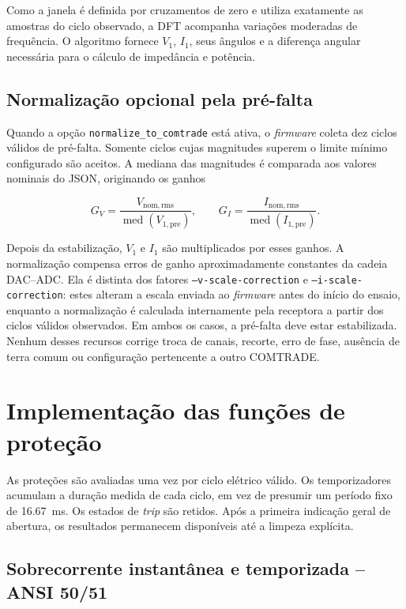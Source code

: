 Como a janela é definida por cruzamentos de zero e utiliza exatamente as amostras do ciclo observado, a DFT acompanha variações moderadas de frequência. O algoritmo fornece $V_1$, $I_1$, seus ângulos e a diferença angular necessária para o cálculo de impedância e potência.

\subsection{Normalização opcional pela pré-falta}

Quando a opção \texttt{normalize\_to\_comtrade} está ativa, o \textit{firmware} coleta dez ciclos válidos de pré-falta. Somente ciclos cujas magnitudes superem o limite mínimo configurado são aceitos. A mediana das magnitudes é comparada aos valores nominais do JSON, originando os ganhos

\begin{equation}
  G_V=\frac{V_{\mathrm{nom,rms}}}{\operatorname{med}(V_{1,\mathrm{pre}})}, \qquad
  G_I=\frac{I_{\mathrm{nom,rms}}}{\operatorname{med}(I_{1,\mathrm{pre}})}.
\end{equation}

Depois da estabilização, $V_1$ e $I_1$ são multiplicados por esses ganhos. A normalização compensa erros de ganho aproximadamente constantes da cadeia DAC--ADC. Ela é distinta dos fatores \texttt{--v-scale-correction} e \texttt{--i-scale-correction}: estes alteram a escala enviada ao \textit{firmware} antes do início do ensaio, enquanto a normalização é calculada internamente pela receptora a partir dos ciclos válidos observados. Em ambos os casos, a pré-falta deve estar estabilizada. Nenhum desses recursos corrige troca de canais, recorte, erro de fase, ausência de terra comum ou configuração pertencente a outro COMTRADE.

\section{Implementação das funções de proteção}

As proteções são avaliadas uma vez por ciclo elétrico válido. Os temporizadores acumulam a duração medida de cada ciclo, em vez de presumir um período fixo de \SI{16,67}{\milli\second}. Os estados de \textit{trip} são retidos. Após a primeira indicação geral de abertura, os resultados permanecem disponíveis até a limpeza explícita.

\subsection{Sobrecorrente instantânea e temporizada -- ANSI 50/51}

